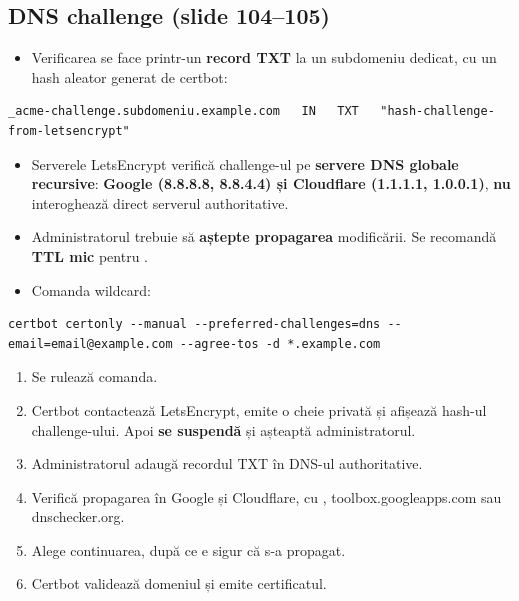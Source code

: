 \documentclass[11pt,a4paper]{article}
\begin{document}
\subsection*{DNS challenge (slide 104--105)}
\begin{itemize}
  \item Verificarea se face printr-un \textbf{record TXT} la un subdomeniu dedicat, cu un hash aleator generat de certbot:
\end{itemize}
\begin{lstlisting}
_acme-challenge.subdomeniu.example.com   IN   TXT   "hash-challenge-from-letsencrypt"
\end{lstlisting}
\begin{itemize}
  \item Serverele LetsEncrypt verifică challenge-ul pe \textbf{servere DNS globale recursive}: \textbf{Google (8.8.8.8, 8.8.4.4) și Cloudflare (1.1.1.1, 1.0.0.1)}, \textbf{nu} interoghează direct serverul authoritative.
  \item Administratorul trebuie să \textbf{aștepte propagarea} modificării. Se recomandă \textbf{TTL mic} pentru .
  \item Comanda wildcard:
\end{itemize}
\begin{lstlisting}
certbot certonly --manual --preferred-challenges=dns --email=email@example.com --agree-tos -d *.example.com
\end{lstlisting}
\begin{enumerate}
  \item Se rulează comanda.
  \item Certbot contactează LetsEncrypt, emite o cheie privată și afișează hash-ul challenge-ului. Apoi \textbf{se suspendă} și așteaptă administratorul.
  \item Administratorul adaugă recordul TXT în DNS-ul authoritative.
  \item Verifică propagarea în Google și Cloudflare, cu , toolbox.googleapps.com sau dnschecker.org.
  \item Alege continuarea, după ce e sigur că s-a propagat.
  \item Certbot validează domeniul și emite certificatul.
\end{enumerate}
\end{document}
